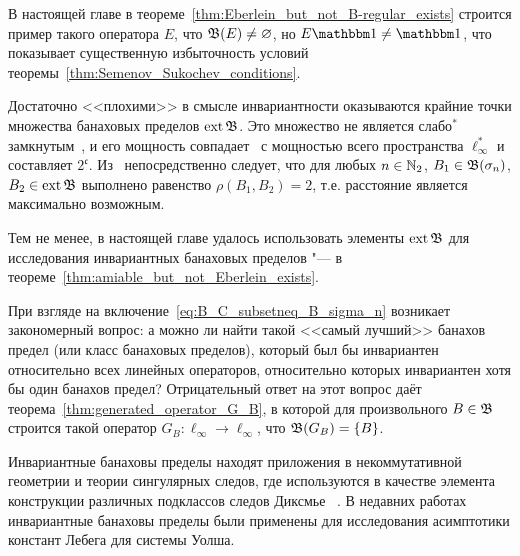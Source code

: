 В настоящей главе в теореме~\ref{thm:Eberlein_but_not_B-regular_exists}
строится пример такого оператора $E$, что $\mathfrak{B}(E)\ne\varnothing$,
но $E\one \ne \one$, что показывает существенную избыточность условий теоремы~\ref{thm:Semenov_Sukochev_conditions}.


Достаточно <<плохими>> в смысле инвариантности оказываются крайние точки множества банаховых пределов $\operatorname{ext} \mathfrak{B}$.
Это множество не является слабо$^*$ замкнутым~\cite{Nillsen,Talagrand},
и его мощность совпадает~\cite{Chou} с мощностью всего пространства $\ell_\infty^*$
и составляет $2^{\mathfrak c}$.
Из~\cite[следствие 6]{semenov2020dilation} непосредственно следует, что для любых
$n\in\mathbb{N}_2$, $B_1 \in \mathfrak{B}(\sigma_n)$, $B_2 \in \operatorname{ext}\mathfrak{B}$ выполнено равенство
$\rho(B_1,B_2) = 2$, т.е. расстояние является максимально возможным.



Тем не менее, в настоящей главе удалось использовать элементы $\operatorname{ext}\mathfrak{B}$ для исследования инвариантных банаховых пределов
"--- в теореме~\ref{thm:amiable_but_not_Eberlein_exists}.

При взгляде на включение~\eqref{eq:B_C_subsetneq_B_sigma_n} возникает закономерный вопрос:
а можно ли найти такой <<самый лучший>> банахов предел (или класс банаховых пределов),
который был бы инвариантен относительно всех линейных операторов,
относительно которых инвариантен хотя бы один банахов предел?
Отрицательный ответ на этот вопрос даёт теорема~\ref{thm:generated_operator_G_B}, в которой
для произвольного $B\in \mathfrak{B}$ строится такой оператор $G_B:\ell_\infty \to \ell_\infty$,
что $\mathfrak{B}(G_B) = \{B\}$.

Инвариантные банаховы пределы находят приложения в некоммутативной геометрии
и теории сингулярных следов, где используются в качестве элемента конструкции
различных подклассов следов Диксмье
~\cite{carey2003spectral,lord2012singular,sukochev2015characterization,sukochev2016dixmier}.
В недавних работах~\cite{astashkin2015constants_rus_DAN,astashkin2016constants_rus_SMJ} инвариантные банаховы пределы были применены для исследования
асимптотики констант Лебега для системы Уолша.

